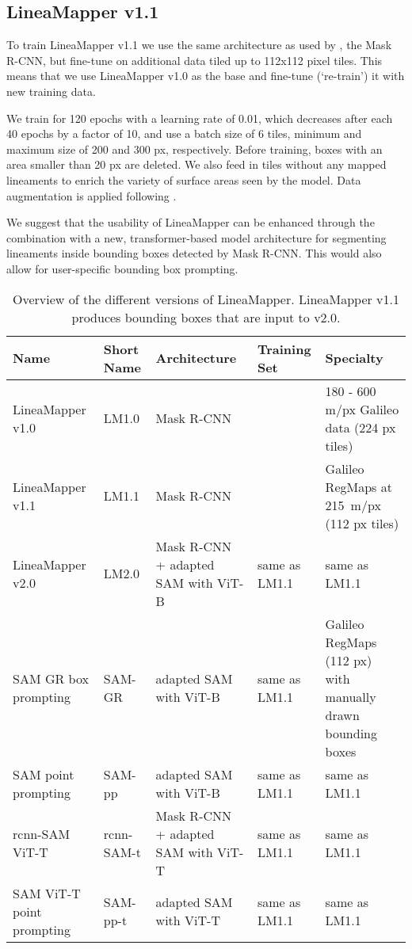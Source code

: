 \subsection{LineaMapper v1.1}\label{sec:LMv1.1}

To train LineaMapper v1.1 we use the same architecture as used by , the Mask R-CNN, but fine-tune on additional data tiled up to 112x112 pixel tiles. This means that we use LineaMapper v1.0 as the base and fine-tune (`re-train') it with new training data.

We train for 120 epochs with a learning rate of 0.01, which decreases after each 40 epochs by a factor of 10, and use a batch size of 6 tiles, minimum and maximum size of 200 and 300 px, respectively. Before training, boxes with an area smaller than 20 px are deleted. We also feed in tiles without any mapped lineaments to enrich the variety of surface areas seen by the model. Data augmentation is applied following .

We suggest that the usability of LineaMapper can be enhanced through the combination with a new, transformer-based model architecture for segmenting lineaments inside bounding boxes detected by Mask R-CNN. This would also allow for user-specific bounding box prompting.

\begin{table*}[t]
    \centering
    \caption{Overview of the different versions of LineaMapper. LineaMapper v1.1 produces bounding boxes that are input to v2.0.}
    \label{tab:Model_overviwe}
    \begin{tabular}{@{}p{2.5cm}P{2cm}p{3cm}lp{4cm}@{}}
    \toprule
    \textbf{Name} & \textbf{Short Name} & \textbf{Architecture} & \textbf{Training Set} & \textbf{Specialty} \\ \midrule
    LineaMapper v1.0 & LM1.0 & Mask R-CNN & \cite{Haslebacher2024a} & 180 - 600 m/px Galileo data (224 px tiles) \\
    LineaMapper v1.1 & LM1.1 & Mask R-CNN &  & Galileo RegMaps at 215~m/px (112 px tiles) \\
    LineaMapper v2.0 & LM2.0 & Mask R-CNN + adapted SAM with ViT-B & same as LM1.1 & same as LM1.1 \\
    SAM GR box prompting & SAM-GR & adapted SAM with ViT-B & same as LM1.1 & Galileo RegMaps (112 px) with manually drawn bounding boxes \\
    SAM point prompting & SAM-pp & adapted SAM with ViT-B & same as LM1.1 & same as LM1.1 \\
    rcnn-SAM ViT-T & rcnn-SAM-t & Mask R-CNN + adapted SAM with ViT-T & same as LM1.1 & same as LM1.1 \\
    SAM ViT-T point prompting & SAM-pp-t & adapted SAM with ViT-T & same as LM1.1 & same as LM1.1 \\ \bottomrule
    \end{tabular}
\end{table*}


